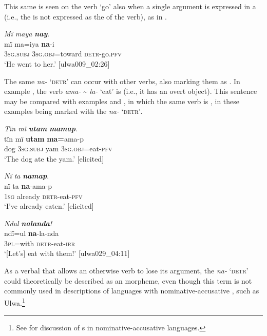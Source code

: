 This same  is seen on the verb ‘go’ also when a single argument is expressed in a  (i.e., the  is not expressed as the  of the verb), as in .

\ea%
    \label{ex:syntax:305}
          \textit{Mï maya} \textbf{\textit{nay}}.\\
\gll mï      ma=iya      \textbf{na}{}-i\\
    3\textsc{sg.subj}  3\textsc{sg.obj}=toward  \textsc{detr-}go.\textsc{pfv}\\
\glt `He went to her.’ [ulwa009\_02:26]
\z

The same  \textit{na-} ‘\textsc{detr’} can occur with other verbs, also marking them as . In example , the verb \textit{ama-} {\textasciitilde} \textit{la-} ‘eat’ is  (i.e., it has an overt object). This sentence may be compared with examples  and , in which the same verb is , in these examples being marked with the  \textit{na-} \textsc{‘detr’}.

\ea%
    \label{ex:syntax:306}
          \textit{Tïn mï} \textbf{\textit{utam}} \textbf{\textit{mamap}}.\\
\gll tïn    mï      \textbf{utam}  \textbf{ma=}ama-p\\
    dog  3\textsc{sg.subj}  yam  3\textsc{sg.obj}=eat-\textsc{pfv}\\
\glt `The dog ate the yam.’ [elicited]
\z

\ea%
    \label{ex:syntax:307}
          \textit{Nï ta} \textbf{\textit{namap}}.\\
\gll nï    ta      \textbf{na}{}-ama-p\\
    1\textsc{sg}  already    \textsc{detr}{}-eat-\textsc{pfv}\\
\glt `I’ve already eaten.’ [elicited]
\z

\ea%
    \label{ex:syntax:308}
          \textit{Ndul} \textbf{\textit{nalanda}}\textit{!}\\
\gll    ndï=ul    \textbf{na}{}-la-nda\\
    3\textsc{pl}=with  \textsc{detr-}eat-\textsc{irr}\\
\glt `[Let’s] eat with them!’ [ulwa029\_04:11]
\z


As a verbal  that allows an otherwise  verb to lose its  argument, the  \textit{na-} \textsc{‘detr’} could theoretically be described as an  morpheme, even though this term is not commonly used in descriptions of languages with nominative-accusative , such as Ulwa.\footnote{See \citet[149--163]{Heaton2017} for discussion of s in nominative-accusative  languages.}

